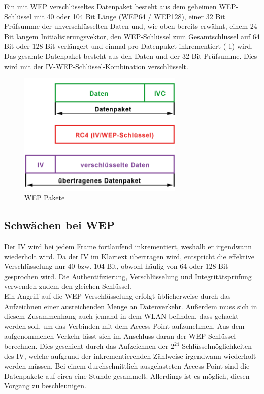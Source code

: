 	Ein mit WEP verschlüsseltes Datenpaket besteht aus dem geheimen WEP-Schlüssel mit 40 oder 104 Bit Länge (WEP64 / WEP128), einer 32 Bit Prüfsumme der unverschlüsselten
	Daten und, wie oben bereits erwähnt, einem 24 Bit langem Initialisierungsvektor, den WEP-Schlüssel zum Gesamtschlüssel auf 64 Bit oder 128 Bit verlängert und einmal pro
	Datenpaket inkrementiert (-1) wird. \\
	Das gesamte Datenpaket besteht aus den Daten und der 32 Bit-Prüfsumme. Dies wird
	mit der IV-WEP-Schlüssel-Kombination verschlüsselt.

			\begin{figure}[H]
				\centering
				\includegraphics[width=0.7\textwidth]{images/WLAN/WEPpakete.png}
				\caption{WEP Pakete}
				\label{fig:WEP Pakete}
			\end{figure}

\subsection{Schwächen bei WEP}
Der IV wird bei jedem Frame fortlaufend inkrementiert, weshalb er irgendwann wiederholt
wird. Da der IV im Klartext übertragen wird, entspricht die effektive Verschlüsselung nur 40 bzw. 104 Bit, obwohl häufig von 64 oder 128 Bit gesprochen wird. Die Authentifizierung, Verschlüsselung und Integritätsprüfung verwenden zudem den gleichen Schlüssel. \\
Ein Angriff auf die WEP-Verschlüsselung erfolgt üblicherweise durch das Aufzeichnen einer
ausreichenden Menge an Datenverkehr. Außerdem muss sich in diesem Zusammenhang auch jemand in dem WLAN befinden, dass gehackt werden soll, um das Verbinden mit dem Access Point aufzunehmen.
Aus dem aufgenommenen Verkehr lässt sich im Anschluss daran der WEP-Schlüssel berechnen. Dies geschieht durch das Aufzeichnen der $2^{24}$ Schlüsselmöglichkeiten des IV, welche aufgrund der inkrementierenden Zählweise irgendwann wiederholt werden müssen. Bei einem durchschnittlich ausgelasteten Access Point sind die Datenpakete auf circa eine Stunde gesammelt. Allerdings ist es möglich, diesen Vorgang zu beschleunigen. \\
\\
